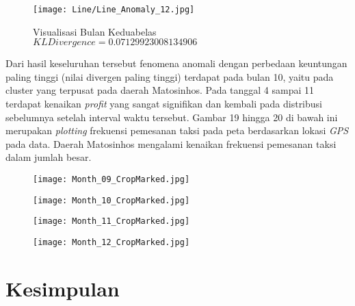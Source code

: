 \documentclass{article}
\begin{document}
\begin{figure}[H]
	\centering
	\texttt{[image: Line/Line\_Anomaly\_12.jpg]}
	\caption{Visualisasi Bulan Keduabelas\\$KL Divergence = 0.07129923008134906$}
\end{figure}

Dari hasil keseluruhan tersebut fenomena anomali dengan  perbedaan keuntungan paling tinggi (nilai divergen paling tinggi) terdapat pada bulan 10, yaitu pada cluster yang terpusat pada daerah Matosinhos. Pada tanggal 4 sampai 11 terdapat kenaikan \textit{profit} yang sangat signifikan dan kembali pada distribusi sebelumnya setelah interval waktu tersebut. Gambar 19 hingga 20 di bawah ini merupakan \textit{plotting} frekuensi pemesanan taksi pada peta berdasarkan lokasi \textit{GPS} pada data. Daerah Matosinhos mengalami kenaikan frekuensi pemesanan taksi dalam jumlah besar.

\begin{figure}[H]
	\centering
	\begin{minipage}{.4\textwidth}
		\centering
		\texttt{[image: Month\_09\_CropMarked.jpg]}
	\end{minipage}%
	\hspace{.1\textwidth}
	\begin{minipage}{.4\textwidth}
		\centering
		\texttt{[image: Month\_10\_CropMarked.jpg]}
	\end{minipage}%
\end{figure}

\begin{figure}[H]
	\centering
	\begin{minipage}{.4\textwidth}
		\centering
		\texttt{[image: Month\_11\_CropMarked.jpg]}
	\end{minipage}%
	\hspace{.1\textwidth}
	\begin{minipage}{.4\textwidth}
		\centering
		\texttt{[image: Month\_12\_CropMarked.jpg]}
	\end{minipage}%
\end{figure}

\section{Kesimpulan}
\end{document}
